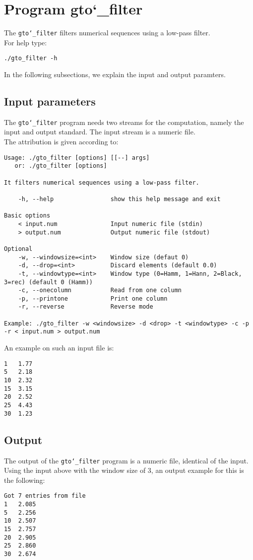 \section{Program gto\char`_filter}
The \texttt{gto\char`_filter} filters numerical sequences using a low-pass filter.\\
For help type:
\begin{lstlisting}
./gto_filter -h
\end{lstlisting}
In the following subsections, we explain the input and output paramters.

\subsection*{Input parameters}

The \texttt{gto\char`_filter} program needs two streams for the computation, namely the input and output standard. The input stream is a numeric file.\\
The attribution is given according to:
\begin{lstlisting}
Usage: ./gto_filter [options] [[--] args]
   or: ./gto_filter [options]

It filters numerical sequences using a low-pass filter.

    -h, --help                show this help message and exit

Basic options
    < input.num               Input numeric file (stdin)
    > output.num              Output numeric file (stdout)

Optional
    -w, --windowsize=<int>    Window size (defaut 0)
    -d, --drop=<int>          Discard elements (default 0.0)
    -t, --windowtype=<int>    Window type (0=Hamm, 1=Hann, 2=Black, 3=rec) (default 0 (Hamm))
    -c, --onecolumn           Read from one column
    -p, --printone            Print one column
    -r, --reverse             Reverse mode

Example: ./gto_filter -w <windowsize> -d <drop> -t <windowtype> -c -p -r < input.num > output.num
\end{lstlisting}
An example on such an input file is:
\begin{lstlisting}
1   1.77
5   2.18
10  2.32
15  3.15
20  2.52
25  4.43
30  1.23
\end{lstlisting}

\subsection*{Output}
The output of the \texttt{gto\char`_filter} program is a numeric file, identical of the input.\\
Using the input above with the window size of 3, an output example for this is the following:
\begin{lstlisting}
Got 7 entries from file
1   2.085
5   2.256
10  2.507
15  2.757
20  2.905
25  2.860
30  2.674
\end{lstlisting}